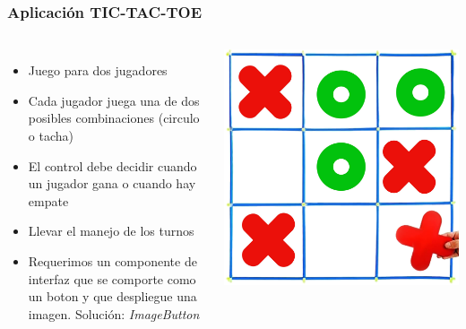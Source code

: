 \begin{frame}[fragile]
\frametitle{Aplicaci\'on TIC-TAC-TOE} 
\begin{columns}
\begin{itemize}
\item Juego para dos jugadores
\item Cada jugador juega una de dos posibles combinaciones (circulo o tacha)
\item El control debe decidir cuando un jugador gana o cuando hay empate
\item Llevar el manejo de los turnos
\item Requerimos un componente de interfaz que se comporte como un boton y que despliegue una imagen. Soluci\'on: \textit{ImageButton}
\end{itemize}
\begin{center}
\includegraphics[width=0.95\linewidth]{00_CambiosInterfaz/TicTacToe.jpg}    
\end{center}

\end{columns}
\end{frame}


